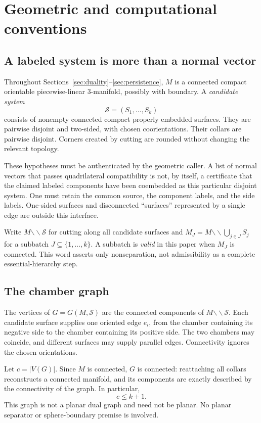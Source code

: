 \documentclass[11pt]{article}
\theoremstyle{definition}
\newcommand{\cut}{\mathbin{\backslash\!\backslash}}
\begin{document}
\section{Geometric and computational conventions}
\subsection{A labeled system is more than a normal vector}
Throughout Sections~\ref{sec:duality}--\ref{sec:persistence}, $M$ is a connected compact orientable piecewise-linear $3$-manifold, possibly with boundary. A \emph{candidate system}
\[
\mathcal S=(S_1,\ldots,S_k)
\]
consists of nonempty connected compact properly embedded surfaces. They are pairwise disjoint and two-sided, with chosen coorientations. Their collars are pairwise disjoint. Corners created by cutting are rounded without changing the relevant topology.

These hypotheses must be authenticated by the geometric caller. A list of normal vectors that passes quadrilateral compatibility is not, by itself, a certificate that the claimed labeled components have been coembedded as this particular disjoint system. One must retain the common source, the component labels, and the side labels. One-sided surfaces and disconnected ``surfaces'' represented by a single edge are outside this interface.

Write $M\cut\mathcal S$ for cutting along all candidate surfaces and $M_J=M\cut\bigcup_{j\in J}S_j$ for a subbatch $J\subseteq\{1,\ldots,k\}$. A subbatch is \emph{valid} in this paper when $M_J$ is connected. This word asserts only nonseparation, not admissibility as a complete essential-hierarchy step.

\subsection{The chamber graph}
The vertices of $G=G(M,\mathcal S)$ are the connected components of $M\cut\mathcal S$. Each candidate surface supplies one oriented edge $e_i$, from the chamber containing its negative side to the chamber containing its positive side. The two chambers may coincide, and different surfaces may supply parallel edges. Connectivity ignores the chosen orientations.

Let $c=|V(G)|$. Since $M$ is connected, $G$ is connected: reattaching all collars reconstructs a connected manifold, and its components are exactly described by the connectivity of the graph. In particular,
\begin{equation}\label{eq:chamber-size}
 c\leq k+1.
\end{equation}
This graph is not a planar dual graph and need not be planar. No planar separator or sphere-boundary premise is involved.
\end{document}
